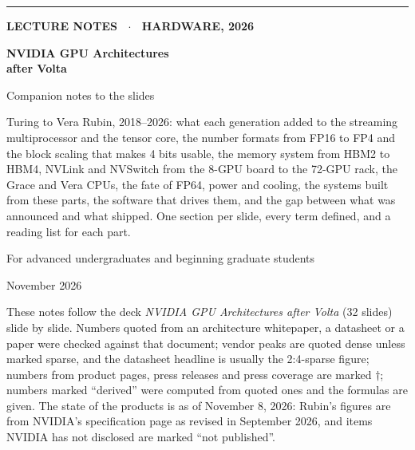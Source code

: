 \documentclass[11pt,letterpaper]{article}
\begin{document}
\begin{titlepage}
\thispagestyle{empty}
\vspace*{2.5cm}
{\color{attn}\rule{3cm}{3pt}}\par\vspace{0.6cm}
{\sffamily\bfseries\color{muted}\large LECTURE NOTES \ $\cdot$ \ HARDWARE, 2026\par}
\vspace{0.4cm}
{\sffamily\bfseries\fontsize{30}{34}\selectfont\color{ink} NVIDIA GPU Architectures\\after Volta\par}
\vspace{0.3cm}
{\sffamily\fontsize{18}{22}\selectfont\color{ink} Companion notes to the slides\par}
\vspace{1.2cm}
{\large\color{muted}\parbox{0.82\textwidth}{Turing to Vera Rubin, 2018--2026: what each generation added to the streaming multiprocessor and the tensor core, the number formats from FP16 to FP4 and the block scaling that makes 4 bits usable, the memory system from HBM2 to HBM4, NVLink and NVSwitch from the 8-GPU board to the 72-GPU rack, the Grace and Vera CPUs, the fate of FP64, power and cooling, the systems built from these parts, the software that drives them, and the gap between what was announced and what shipped. One section per slide, every term defined, and a reading list for each part.}\par}
\vspace{1.5cm}
{\color{muted}For advanced undergraduates and beginning graduate students\par}
\vspace{0.3cm}
{\color{muted}November 2026\par}
\vfill
{\small\color{muted}\parbox{0.9\textwidth}{These notes follow the deck \textit{NVIDIA GPU Architectures after Volta} (32 slides) slide by slide. Numbers quoted from an architecture whitepaper, a datasheet or a paper were checked against that document; vendor peaks are quoted dense unless marked sparse, and the datasheet headline is usually the 2:4-sparse figure; numbers from product pages, press releases and press coverage are marked $\dagger$; numbers marked ``derived'' were computed from quoted ones and the formulas are given. The state of the products is as of November 8, 2026: Rubin's figures are from NVIDIA's specification page as revised in September 2026, and items NVIDIA has not disclosed are marked ``not published''.}\par}
\end{titlepage}
\end{document}
